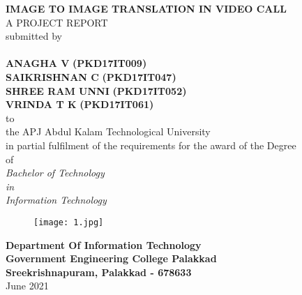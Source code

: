 \documentclass[12pt, a4paper]{report}
\begin{document}
\begin{titlepage}
\begin{center} 
\vspace*{-1cm} 
{\Large \bfseries IMAGE TO IMAGE TRANSLATION IN VIDEO CALL} \\[2mm] 
{\fontsize{5mm}{1mm}  A PROJECT REPORT } \\[3mm] 
{\large  submitted by} \\[4mm] 
{\fontsize{5mm}{1mm}\Large \bfseries  } \\[2mm] 
    {\normalsize \textbf{ ANAGHA V}} \small{\textbf{(PKD17IT009)}}  \\
    {\normalsize \textbf{ SAIKRISHNAN C}} \small{\textbf{(PKD17IT047)}} \\
    {\normalsize \textbf{SHREE RAM UNNI}} \small{\textbf{(PKD17IT052)}}  \\ 
    {\normalsize \textbf{VRINDA T K }} \small{\textbf{(PKD17IT061)}}  \\[6mm] 
{\large  to } \\[3mm] 
{\large  the APJ Abdul Kalam Technological University} \\[2mm] 
{\large  in partial fulﬁlment of the requirements for the award of the Degree} \\[2mm] 
{\large  of } \\[3mm] 
{\fontsize{5mm}{1mm} \textit {Bachelor of Technology} } \\[2mm] 
{\large  \textit{in} } \\[2mm] 
{\fontsize{5mm}{1mm} \textit {Information Technology} } \\[2mm] 
\begin{figure}[ht!] 
    \centering 
    \texttt{[image: 1.jpg]} 
\end{figure} 
{\large \bfseries Department Of Information Technology} \\[2mm] 
{\large \bfseries Government Engineering College Palakkad} \\[2mm] 
{\large \bfseries Sreekrishnapuram, Palakkad - 678633} \\[2mm] 
{\large June 2021} \\[4.5mm] 
\end{center} 
    
 \pagebreak   


\end{titlepage}
\end{document}
